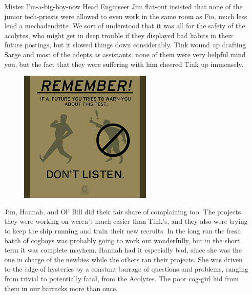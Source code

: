 Mister I'm-a-big-boy-now Head Enginseer Jim flat-out insisted that none of the junior tech-priests were allowed to even work in the same room as Fio, much less lend a mechadendrite. 
We sort of understood that it was all for the safety of the acolytes, who might get in deep trouble if they displayed bad habits in their future postings, but it slowed things down considerably. 
Tink wound up drafting Sarge and most of the adepts as assistants; 
none of them were very helpful mind you, but the fact that they were suffering with him cheered Tink up immensely.
\begin{figure}
	\begin{center}
		\includegraphics[width=\figwidth]{pics/12/8.png}
	\end{center}
\end{figure}
Jim, Hannah, and Ol' Bill did their fair share of complaining too. 
The projects they were working on weren't much easier than Tink's, and they also were trying to keep the ship running and train their new recruits. 
In the long run the fresh batch of cogboys was probably going to work out wonderfully, but in the short term it was complete mayhem. 
Hannah had it especially bad, since she was the one in charge of the newbies while the others ran their projects. 
She was driven to the edge of hysterics by a constant barrage of questions and problems, ranging from trivial to potentially fatal, from the Acolytes. 
The poor cog-girl hid from them in our barracks more than once.

